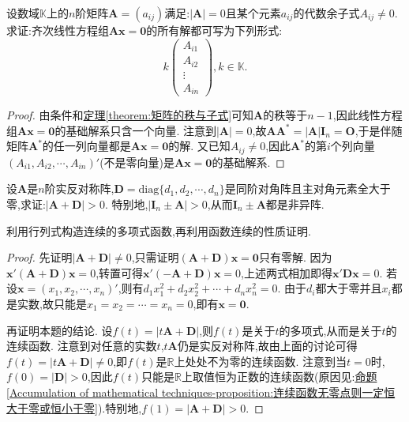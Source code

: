 \documentclass[lang=cn,newtx,10pt,scheme=chinese]{elegantbook}
\begin{document}
\begin{proposition}\label{proposition:奇异系数矩阵Ax=0的解空间}
设数域\(\mathbb{K}\)上的\(n\)阶矩阵\(\boldsymbol{A}=(a_{ij})\)满足:\(|\boldsymbol{A}| = 0\)且某个元素\(a_{ij}\)的代数余子式\(A_{ij}\neq0\). 求证:齐次线性方程组\(\boldsymbol{A}\boldsymbol{x}=\boldsymbol{0}\)的所有解都可写为下列形式:
\[
k\begin{pmatrix}
A_{i1}\\
A_{i2}\\
\vdots\\
A_{in}
\end{pmatrix},k\in\mathbb{K}.
\]
\end{proposition}
\begin{proof}
由条件和\hyperref[theorem:矩阵的秩与子式]{定理\ref{theorem:矩阵的秩与子式}}可知\(\boldsymbol{A}\)的秩等于\(n - 1\),因此线性方程组\(\boldsymbol{A}\boldsymbol{x}=\boldsymbol{0}\)的基础解系只含一个向量. 注意到\(|\boldsymbol{A}| = 0\),故\(\boldsymbol{A}\boldsymbol{A}^*=|\boldsymbol{A}|\boldsymbol{I}_n=\boldsymbol{O}\),于是伴随矩阵\(\boldsymbol{A}^*\)的任一列向量都是\(\boldsymbol{A}\boldsymbol{x}=\boldsymbol{0}\)的解. 又已知\(A_{ij}\neq0\),因此\(\boldsymbol{A}^*\)的第\(i\)个列向量\((A_{i1},A_{i2},\cdots,A_{in})'\)(不是零向量)是\(\boldsymbol{A}\boldsymbol{x}=\boldsymbol{0}\)的基础解系.   
\end{proof}

\begin{example}
设\(\boldsymbol{A}\)是\(n\)阶实反对称阵,\(\boldsymbol{D}=\mathrm{diag}\{d_1,d_2,\cdots,d_n\}\)是同阶对角阵且主对角元素全大于零,求证:\(|\boldsymbol{A}+\boldsymbol{D}|>0\). 特别地,\(|\boldsymbol{I}_n\pm\boldsymbol{A}|>0\),从而\(\boldsymbol{I}_n\pm\boldsymbol{A}\)都是非异阵.
\end{example}
\begin{note}
利用行列式构造连续的多项式函数,再利用函数连续的性质证明.
\end{note}
\begin{proof}
先证明\(|\boldsymbol{A}+\boldsymbol{D}|\neq0\),只需证明\((\boldsymbol{A}+\boldsymbol{D})\boldsymbol{x}=\boldsymbol{0}\)只有零解. 因为\(\boldsymbol{x}'(\boldsymbol{A}+\boldsymbol{D})\boldsymbol{x}=0\),转置可得\(\boldsymbol{x}'(-\boldsymbol{A}+\boldsymbol{D})\boldsymbol{x}=0\),上述两式相加即得\(\boldsymbol{x}'\boldsymbol{D}\boldsymbol{x}=0\). 若设\(\boldsymbol{x}=(x_1,x_2,\cdots,x_n)'\),则有\(d_1x_1^2 + d_2x_2^2+\cdots + d_nx_n^2 = 0\). 由于\(d_i\)都大于零并且\(x_i\)都是实数,故只能是\(x_1 = x_2=\cdots = x_n = 0\),即有\(\boldsymbol{x}=\boldsymbol{0}\).

再证明本题的结论. 设\(f(t)=|t\boldsymbol{A}+\boldsymbol{D}|\),则\(f(t)\)是关于\(t\)的多项式,从而是关于\(t\)的连续函数. 注意到对任意的实数\(t\),\(t\boldsymbol{A}\)仍是实反对称阵,故由上面的讨论可得\(f(t)=|t\boldsymbol{A}+\boldsymbol{D}|\neq0\),即\(f(t)\)是\(\mathbb{R}\)上处处不为零的连续函数. 注意到当\(t = 0\)时,\(f(0)=|\boldsymbol{D}|>0\),因此\(f(t)\)只能是\(\mathbb{R}\)上取值恒为正数的连续函数(原因见:\hyperref[Accumulation of mathematical techniques-proposition:连续函数无零点则一定恒大于零或恒小于零]{命题\ref{Accumulation of mathematical techniques-proposition:连续函数无零点则一定恒大于零或恒小于零}}).特别地,\(f(1)=|\boldsymbol{A}+\boldsymbol{D}|>0\). 
\end{proof}
\end{document}
